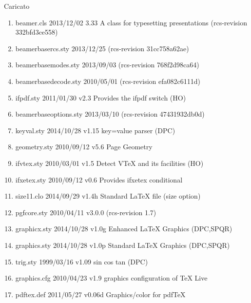 Caricato 
\begin{enumerate}
\item beamer.cls 2013/12/02 3.33 A class for typesetting presentations (rcs-revision 332bfd3ce558)
\item beamerbasercs.sty 2013/12/25 (rcs-revision 31cc758a62ae)
\item beamerbasemodes.sty 2013/09/03 (rcs-revision 768f2d98ca64)
\item beamerbasedecode.sty 2010/05/01 (rcs-revision efa082c6111d)
\item ifpdf.sty 2011/01/30 v2.3 Provides the ifpdf switch (HO)
\item beamerbaseoptions.sty 2013/03/10 (rcs-revision 47431932db0d)
\item keyval.sty 2014/10/28 v1.15 key=value parser (DPC)
\item geometry.sty 2010/09/12 v5.6 Page Geometry
\item ifvtex.sty 2010/03/01 v1.5 Detect VTeX and its facilities (HO)
\item ifxetex.sty 2010/09/12 v0.6 Provides ifxetex conditional
\item size11.clo 2014/09/29 v1.4h Standard LaTeX file (size option)
\item pgfcore.sty 2010/04/11 v3.0.0 (rcs-revision 1.7)
\item graphicx.sty 2014/10/28 v1.0g Enhanced LaTeX Graphics (DPC,SPQR)
\item graphics.sty 2014/10/28 v1.0p Standard LaTeX Graphics (DPC,SPQR)
\item trig.sty 1999/03/16 v1.09 sin cos tan (DPC)
\item graphics.cfg 2010/04/23 v1.9 graphics configuration of TeX Live
\item pdftex.def 2011/05/27 v0.06d Graphics/color for pdfTeX

\end{enumerate}
